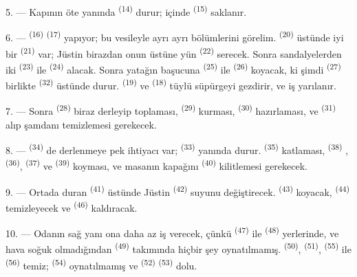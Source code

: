 5. --- Kapının öte yanında  \textsuperscript{(14)}
durur; içinde  \textsuperscript{(15)} saklanır.

6. ---  \textsuperscript{(16)} 
\textsuperscript{(17)} yapıyor; bu vesileyle ayrı ayrı bölümlerini görelim.
 \textsuperscript{(20)} üstünde iyi bir  \textsuperscript{(21)} var; Jüstin birazdan onun üstüne yün
 \textsuperscript{(22)} serecek. Sonra sandalyelerden iki
 \textsuperscript{(23)} ile 
\textsuperscript{(24)} alacak. Sonra yatağın başucuna 
\textsuperscript{(25)} ile  \textsuperscript{(26)} koyacak, ki
şimdi  \textsuperscript{(27)} birlikte  \textsuperscript{(32)} üstünde durur. 
\textsuperscript{(19)} ve  \textsuperscript{(18)} tüylü
süpürgeyi gezdirir, ve iş yarılanır.

7. --- Sonra  \textsuperscript{(28)} biraz derleyip toplaması,
 \textsuperscript{(29)} kurması, 
\textsuperscript{(30)} hazırlaması, ve  \textsuperscript{(31)}
alıp şamdanı temizlemesi gerekecek.

\VUsaut{5.0mm}
\VUsaut{3.0mm}

8. ---  \textsuperscript{(34)} de derlenmeye pek
ihtiyacı var;  \textsuperscript{(33)} yanında durur.
 \textsuperscript{(35)} katlaması, 
\textsuperscript{(38)} , 
\textsuperscript{(36)},  \textsuperscript{(37)} ve
 \textsuperscript{(39)} koyması, ve masanın kapağını
 \textsuperscript{(40)} kilitlemesi gerekecek.

9. --- Ortada duran  \textsuperscript{(41)} üstünde
Jüstin  \textsuperscript{(42)} suyunu değiştirecek.
 \textsuperscript{(43)}  koyacak,
 \textsuperscript{(44)} temizleyecek ve
 \textsuperscript{(46)} kaldıracak.

10. --- Odanın sağ yanı ona daha az iş verecek, çünkü 
\textsuperscript{(47)} ile  \textsuperscript{(48)}
yerlerinde, ve hava soğuk olmadığından 
\textsuperscript{(49)} takımında hiçbir şey oynatılmamış. 
\textsuperscript{(50)},  \textsuperscript{(51)},
 \textsuperscript{(55)} ile 
\textsuperscript{(56)} temiz;  \textsuperscript{(54)}
oynatılmamış ve  \textsuperscript{(52)}
 \textsuperscript{(53)} dolu.

